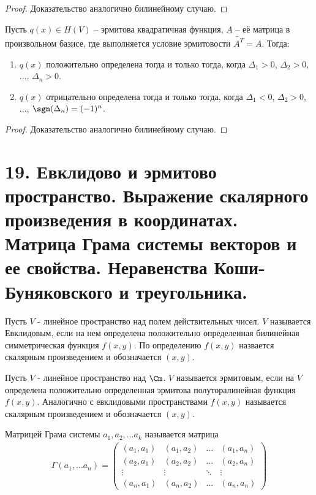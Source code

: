 \begin{proof}
    Доказательство аналогично билинейному случаю.
\end{proof}

\begin{proposition}
    Пусть $q(x) \in H(V)$ -- эрмитова квадратичная функция, $A$ -- её матрица в произвольном базисе, где 
    выполняется условие эрмитовости $\tilde{A^T} = A$. Тогда:
    \begin{enumerate}
        \item $q(x)$ положительно определена тогда и только тогда, когда $\Delta_1 > 0$, $\Delta_2 > 0$, $\dots$, 
        $\Delta_n > 0$.
        \item $q(x)$ отрицательно определена тогда и только тогда, когда $\Delta_1 < 0$, $\Delta_2 > 0$, $\dots$, 
        $\sgn (\Delta_n) = (-1)^n$.
    \end{enumerate}
\end{proposition}

\begin{proof}
    Доказательство аналогично билинейному случаю.
\end{proof}

\section{19. Евклидово и эрмитово пространство. Выражение скалярного произведения в координатах. Матрица Грама системы векторов и ее свойства. Неравенства Коши-Буняковского и треугольника.}

\begin{definition}
    Пусть $V$ - линейное пространство над полем действительных чисел. $V$ называется Евклидовым, если 
    на нем определена положительно определенная билинейная симметрическая функция $f(x, y)$. По 
    определению $f(x, y)$ назвается скалярным произведением и обозначается $(x, y)$.
\end{definition}

\begin{definition}
    Пусть $V$ - линейное пространство над $\Cm$. $V$ называется эрмитовым, если на $V$ определена 
    положительно определенная эрмитова полуторалинейная функция $f(x, y)$. Аналогично с евклидовыми 
    пространствами $f(x, y)$ называется скалярным произведением и обозначается $(x, y)$.
\end{definition}

\begin{definition}
    Матрицей Грама системы $a_1, a_2, \dots a_k$ называется матрица 
    \begin{gather*}
        \Gamma(a_1, \dots a_n) = \begin{pmatrix}
        (a_1, a_1)      & (a_1, a_2)      & \dots  & (a_1, a_n)       \\
        (a_2, a_1)      & (a_2, a_2)      & \dots  & (a_2, a_n)       \\
        \vdots & \vdots & \ddots & \vdots   \\
        (a_n, a_1)      & (a_n, a_2)      & \dots  & (a_n, a_n)
        \end{pmatrix}
    \end{gather*}
\end{definition}


